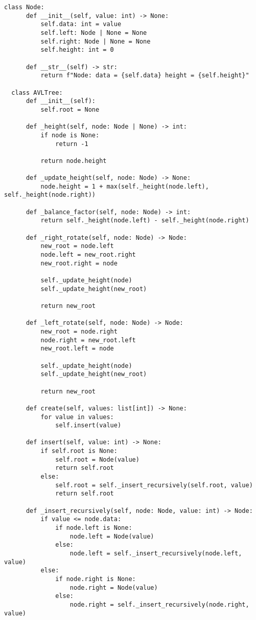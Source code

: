   \begin{lstlisting}[caption=二分ヒープの実装, label=binaryheap, frame=TRBL, label={binaryheap}]
  class Node:
      def __init__(self, value: int) -> None:
          self.data: int = value
          self.left: Node | None = None
          self.right: Node | None = None
          self.height: int = 0
      
      def __str__(self) -> str:
          return f"Node: data = {self.data} height = {self.height}"
          
  class AVLTree:
      def __init__(self):
          self.root = None
      
      def _height(self, node: Node | None) -> int:
          if node is None:
              return -1
          
          return node.height
          
      def _update_height(self, node: Node) -> None:
          node.height = 1 + max(self._height(node.left), self._height(node.right))
  
      def _balance_factor(self, node: Node) -> int:
          return self._height(node.left) - self._height(node.right)
  
      def _right_rotate(self, node: Node) -> Node:
          new_root = node.left
          node.left = new_root.right
          new_root.right = node
          
          self._update_height(node)
          self._update_height(new_root)
          
          return new_root 
      
      def _left_rotate(self, node: Node) -> Node:
          new_root = node.right
          node.right = new_root.left
          new_root.left = node
          
          self._update_height(node)
          self._update_height(new_root)
          
          return new_root
          
      def create(self, values: list[int]) -> None:
          for value in values:
              self.insert(value)
      
      def insert(self, value: int) -> None:
          if self.root is None:
              self.root = Node(value)
              return self.root
          else:
              self.root = self._insert_recursively(self.root, value)
              return self.root
      
      def _insert_recursively(self, node: Node, value: int) -> Node:
          if value <= node.data:
              if node.left is None:
                  node.left = Node(value)
              else:
                  node.left = self._insert_recursively(node.left, value)
          else:
              if node.right is None:
                  node.right = Node(value)
              else:
                  node.right = self._insert_recursively(node.right, value)
          

\end{lstlisting}
